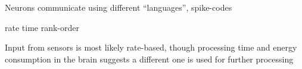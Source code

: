 Neurons communicate using different ``languages'', spike-codes

rate
time
rank-order

Input from sensors is most likely rate-based, though processing time and energy consumption in the brain suggests a different one is used for further processing